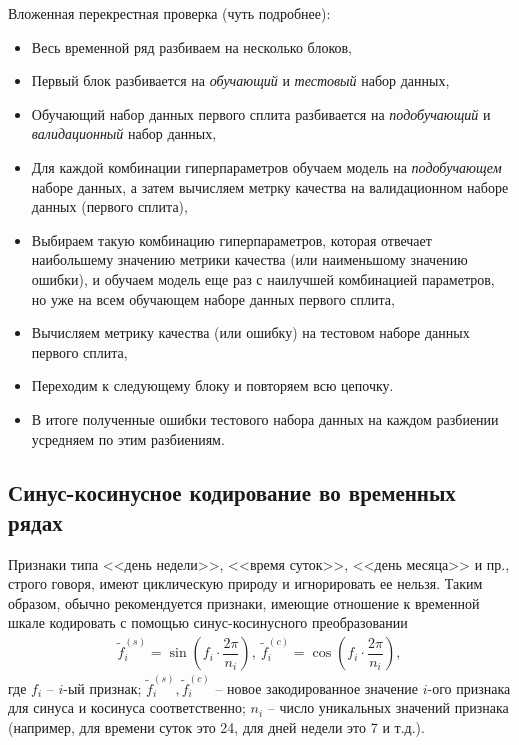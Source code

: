 \documentclass[%
	11pt,
	a4paper,
	utf8,
		]{article}
\begin{document}
Вложенная перекрестная проверка (чуть подробнее):
\begin{itemize}
	\item Весь временной ряд разбиваем на несколько блоков,
	
	\item Первый блок разбивается на \emph{обучающий} и \emph{тестовый} набор данных,
	
	\item Обучающий набор данных первого сплита разбивается на \emph{подобучающий} и \emph{валидационный} набор данных,
	
	\item Для каждой комбинации гиперпараметров обучаем модель на \emph{подобучающем} наборе данных, а затем вычисляем метрку качества на валидационном наборе данных (первого сплита),
	
	\item Выбираем такую комбинацию гиперпараметров, которая отвечает наибольшему значению метрики качества (или наименьшому значению ошибки), и обучаем модель еще раз с наилучшей комбинацией параметров, но уже на всем обучающем наборе данных первого сплита,
	
	\item Вычисляем метрику качества (или ошибку) на тестовом наборе данных первого сплита,
	
	\item Переходим к следующему блоку и повторяем всю цепочку.
	
	\item В итоге полученные ошибки тестового набора данных на каждом разбиении усредняем по этим разбиениям.
\end{itemize}


\subsection{Синус-косинусное кодирование во временных рядах}

Признаки типа <<день недели>>, <<время суток>>, <<день месяца>> и пр., строго говоря, имеют циклическую природу и игнорировать ее нельзя. Таким образом, обычно рекомендуется признаки, имеющие отношение к временной шкале кодировать с помощью синус-косинусного преобразовании
\begin{align*}
	\tilde{f}_i^{(s)} = \sin (f_i \cdot \dfrac{2 \pi}{n_i}),\ \tilde{f}_i^{(c)} = \cos (f_i \cdot \dfrac{2 \pi}{n_i}),
\end{align*}
где $ f_i $ -- $ i $-ый признак; $ \tilde{f}_i^{(s)}, \tilde{f}_i^{(c)} $ -- новое закодированное значение $ i $-ого признака для синуса и косинуса соответственно; $ n_i $ -- число уникальных значений признака (например, для времени суток это 24, для дней недели это 7 и т.д.).
\end{document}
